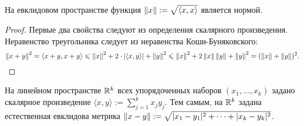 \documentclass[a4paper]{article}
\theoremstyle{named}
\begin{document}
        \begin{consequence*}
            На евклидовом пространстве функция $\left\lVert x\right\rVert := \sqrt{\langle x, x \rangle}$ является нормой.
        \end{consequence*}

        \begin{proof}
            Первые два свойства следуют из определения скалярного произведения. Неравенство треугольника следует из неравенства Коши-Буняковского:
            \begin{equation*}
                \left\lVert x + y\right\rVert^2 = \langle x + y, x + y \rangle \leqslant \left\lVert x\right\rVert^2 + 2 \cdot |\langle x, y \rangle| + \left\lVert y\right\rVert^2 \leqslant \left\lVert x\right\rVert^2 + 2\left\lVert x\right\rVert\left\lVert y\right\rVert + \left\lVert y\right\rVert^2 = (\left\lVert x\right\rVert + \left\lVert y\right\rVert)^2.
            \end{equation*}
        \end{proof}

        \begin{example*}
            На линейном пространстве $\mathbb{R}^k$ всех упорядоченных наборов $(x_1, \dots, x_k)$ задано скалярное произведение $\langle x, y \rangle := \sum_{j = 1}^k x_jy_j$. Тем самым, на $\mathbb{R}^k$ задана естественная евклидова метрика $\left\lVert x - y\right\rVert := \sqrt{|x_1 - y_1|^2 + \dots + |x_k - y_k|^2}$.
        \end{example*}
\end{document}
